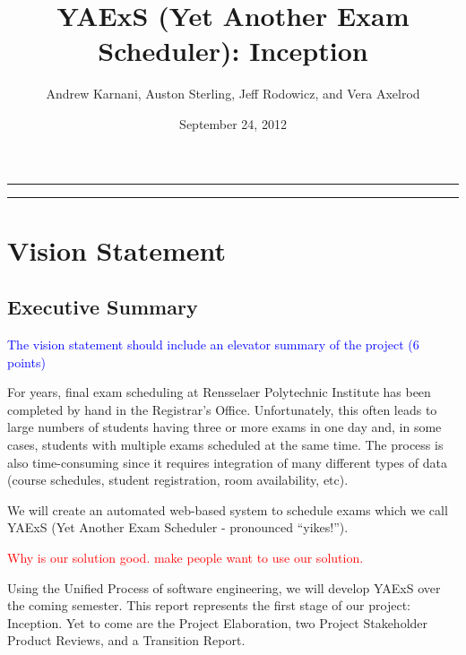 \documentclass[11pt]{article}
\author{Andrew Karnani, Auston Sterling, Jeff Rodowicz, and Vera Axelrod}
\title{YAExS {(Yet Another Exam Scheduler)}: Inception}
\date{September 24, 2012}
\begin{document}
\maketitle
\vspace{-0.1in}
\hrule

\tableofcontents %

\vspace{0.3in}
\hrule

\section{Vision Statement}
\subsection{Executive Summary} %
\textcolor{blue}{The vision statement should include an elevator summary of the project (6 points)}

For years, final exam scheduling at Rensselaer Polytechnic Institute has been
 completed by hand in the Registrar’s Office. 
Unfortunately, this often leads to large numbers of students having three or more
 exams in one day and, in some cases, students with multiple exams scheduled at
 the same time.  
 The process is also time-consuming since it requires integration of many different
 types of data (course schedules, student registration, room availability, etc). 

We will create an automated web-based system to schedule exams which we call YAExS 
(Yet Another Exam Scheduler - pronounced “yikes!”).

\textcolor{red}{Why is our solution good. make people want to use our solution.}

Using the Unified Process of software engineering, we will develop YAExS
 over the coming semester. 
This report represents the first stage of our project: Inception. 
Yet to come are the Project Elaboration, two Project Stakeholder Product Reviews,
 and a Transition Report.

\begin{comment}
This system will integrate all the data necessary to schedule exams and create a
excellent exam schedule.  
The entire system will be customizable, easy to use, and flexible
 so that the exam schedule can be changed to satisfy last-minute requirements.
\end{comment}
\end{document}
